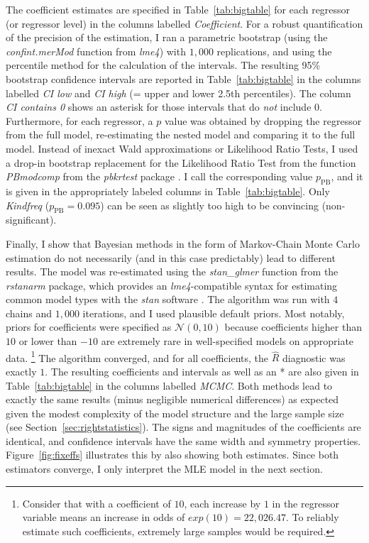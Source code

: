 \documentclass[USenglish]{article}
\newcommand{\mpPB}{\ensuremath{p_{\text{PB}}}}
\begin{document}
The coefficient estimates are specified in Table~\ref{tab:bigtable} for each regressor (or regressor level) in the columns labelled \textit{Coefficient}.
For a robust quantification of the precision of the estimation, I ran a parametric bootstrap (using the \mbox{\textit{confint.merMod}} function from \textit{lme4}) with $1,000$ replications, and using the percentile method for the calculation of the intervals.
The resulting 95\% bootstrap confidence intervals are reported in Table~\ref{tab:bigtable} in the columns labelled \textit{CI low} and \textit{CI high} (= upper and lower 2.5th percentiles).
The column \textit{CI contains 0} shows an asterisk for those intervals that do \textit{not} include 0.
Furthermore, for each regressor, a $p$ value was obtained by dropping the regressor from the full model, re-estimating the nested model and comparing it to the full model.
Instead of inexact Wald approximations or Likelihood Ratio Tests, I used a drop-in bootstrap replacement for the Likelihood Ratio Test from the function \textit{PBmodcomp} from the \textit{pbkrtest} package \citep{HalekohHojsgaard2014}.
I call the corresponding value $p_{\text{PB}}$, and it is given in the appropriately labeled columns in Table~\ref{tab:bigtable}.
Only \textit{Kindfreq} ($\mpPB=0.095$) can be seen as slightly too high to be convincing (non-significant).

Finally, I show that Bayesian methods in the form of Markov-Chain Monte Carlo estimation do not necessarily (and in this case predictably) lead to different results.
The model was re-estimated using the \textit{stan\_glmer} function from the \textit{rstanarm} package, which provides an \textit{lme4}-compatible syntax for estimating common model types with the \textit{stan} software \citep{CarpenterEa2017}.
The algorithm was run with $4$ chains and $1,000$ iterations, and I used plausible default priors.
Most notably, priors for coefficients were specified as $\mathcal{N}(0,10)$ because coefficients higher than $10$ or lower than $-10$ are extremely rare in well-specified models on appropriate data.%
\footnote{Consider that with a coefficient of $10$, each increase by $1$ in the regressor variable means an increase in odds of $exp(10)=22,026.47$.
To reliably estimate such coefficients, extremely large samples would be required.}
The algorithm converged, and for all coefficients, the $\hat{R}$ diagnostic was exactly $1$.
The resulting coefficients and intervals as well as an * are also given in Table~\ref{tab:bigtable} in the columns labelled \textit{MCMC}.
Both methods lead to exactly the same results (minus negligible numerical differences) as expected given the modest complexity of the model structure and the large sample size (see Section~\ref{sec:rightstatistics}).
The signs and magnitudes of the coefficients are identical, and confidence intervals have the same width and symmetry properties.
Figure~\ref{fig:fixeffs} illustrates this by also showing both estimates.
Since both estimators converge, I only interpret the MLE model in the next section.
\end{document}
